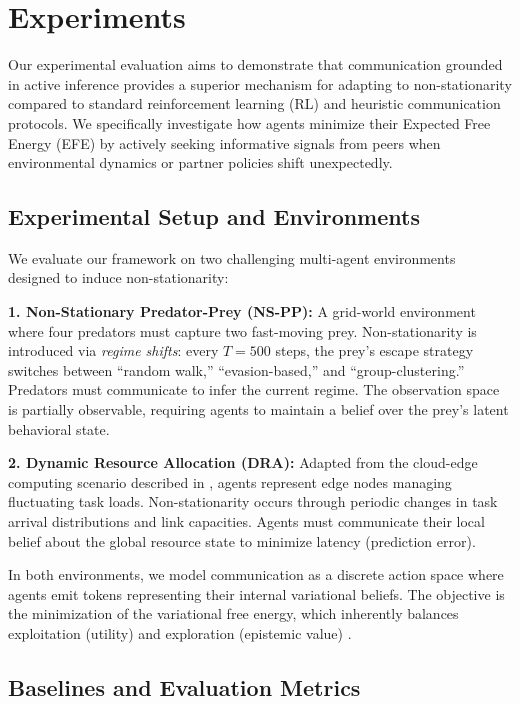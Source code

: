 \section{Experiments}
\label{sec:experiments}

Our experimental evaluation aims to demonstrate that communication grounded in active inference provides a superior mechanism for adapting to non-stationarity compared to standard reinforcement learning (RL) and heuristic communication protocols. We specifically investigate how agents minimize their Expected Free Energy (EFE) by actively seeking informative signals from peers when environmental dynamics or partner policies shift unexpectedly.

\subsection{Experimental Setup and Environments}
\label{sec:setup}

We evaluate our framework on two challenging multi-agent environments designed to induce non-stationarity:

\textbf{1. Non-Stationary Predator-Prey (NS-PP):} A grid-world environment where four predators must capture two fast-moving prey. Non-stationarity is introduced via \textit{regime shifts}: every $T=500$ steps, the prey's escape strategy switches between ``random walk,'' ``evasion-based,'' and ``group-clustering.'' Predators must communicate to infer the current regime. The observation space is partially observable, requiring agents to maintain a belief over the prey's latent behavioral state.

\textbf{2. Dynamic Resource Allocation (DRA):} Adapted from the cloud-edge computing scenario described in \cite{ref_new_Largelanguagemo}, agents represent edge nodes managing fluctuating task loads. Non-stationarity occurs through periodic changes in task arrival distributions and link capacities. Agents must communicate their local belief about the global resource state to minimize latency (prediction error).

In both environments, we model communication as a discrete action space where agents emit tokens representing their internal variational beliefs. The objective is the minimization of the variational free energy, which inherently balances exploitation (utility) and exploration (epistemic value) \cite{ref_new_TheMissingRewar}.

\subsection{Baselines and Evaluation Metrics}
\label{sec:baselines}

